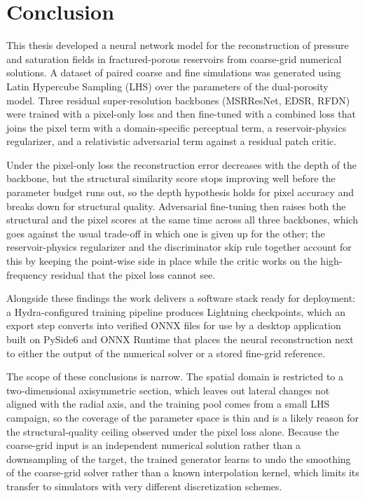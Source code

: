 \chapter{Conclusion}
\label{chap:conclusion}

This thesis developed a neural network model for the reconstruction of pressure and saturation fields in fractured-porous reservoirs from coarse-grid numerical solutions. A dataset of paired coarse and fine simulations was generated using Latin Hypercube Sampling (LHS) over the parameters of the dual-porosity model. Three residual super-resolution backbones (MSRResNet, EDSR, RFDN) were trained with a pixel-only loss and then fine-tuned with a combined loss that joins the pixel term with a domain-specific perceptual term, a reservoir-physics regularizer, and a relativistic adversarial term against a residual patch critic.

Under the pixel-only loss the reconstruction error decreases with the depth of the backbone, but the structural similarity score stops improving well before the parameter budget runs out, so the depth hypothesis holds for pixel accuracy and breaks down for structural quality. Adversarial fine-tuning then raises both the structural and the pixel scores at the same time across all three backbones, which goes against the usual trade-off in which one is given up for the other; the reservoir-physics regularizer and the discriminator skip rule together account for this by keeping the point-wise side in place while the critic works on the high-frequency residual that the pixel loss cannot see.

Alongside these findings the work delivers a software stack ready for deployment: a Hydra-configured training pipeline produces Lightning checkpoints, which an export step converts into verified ONNX files for use by a desktop application built on PySide6 and ONNX Runtime that places the neural reconstruction next to either the output of the numerical solver or a stored fine-grid reference.

The scope of these conclusions is narrow. The spatial domain is restricted to a two-dimensional axisymmetric section, which leaves out lateral changes not aligned with the radial axis, and the training pool comes from a small LHS campaign, so the coverage of the parameter space is thin and is a likely reason for the structural-quality ceiling observed under the pixel loss alone. Because the coarse-grid input is an independent numerical solution rather than a downsampling of the target, the trained generator learns to undo the smoothing of the coarse-grid solver rather than a known interpolation kernel, which limits its transfer to simulators with very different discretization schemes.

